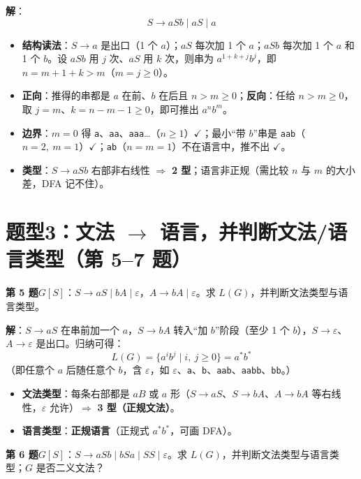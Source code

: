 \documentclass[12pt,a4paper,fontset=windows]{ctexart}
\newcommand{\ok}{\ensuremath{\checkmark}}
\newcommand{\imp}{\ensuremath{\Rightarrow}}
\begin{document}
\textbf{解}：
\[
S \to aSb \mid aS \mid a
\]
\begin{itemize}
\item \textbf{结构读法}：$S \to a$ 是出口（1 个 $a$）；$aS$ 每次加 1 个 $a$；$aSb$ 每次加 1 个 $a$ 和 1 个 $b$。设 $aSb$ 用 $j$ 次、$aS$ 用 $k$ 次，则串为 $a^{1+k+j} b^{j}$，即 $n = m + 1 + k > m$（$m = j \ge 0$）。
\item \textbf{正向}：推得的串都是 $a$ 在前、$b$ 在后且 $n > m \ge 0$；\textbf{反向}：任给 $n > m \ge 0$，取 $j = m$、$k = n-m-1 \ge 0$，即可推出 $a^n b^m$。
\item \textbf{边界}：$m = 0$ 得 \texttt{a}、\texttt{aa}、\texttt{aaa}…（$n \ge 1$）\ok；最小``带 $b$''串是 \texttt{aab}（$n=2,\ m=1$）\ok；\texttt{ab}（$n=m=1$）不在语言中，推不出 \ok。
\item \textbf{类型}：$S \to aSb$ 右部非右线性 \imp{} \textbf{2 型}；语言非正规（需比较 $n$ 与 $m$ 的大小差，DFA 记不住）。
\end{itemize}

\section{\texorpdfstring{题型3：文法 $\to$ 语言，并判断文法/语言类型（第 5--7 题）}{题型3：文法→语言，并判断文法/语言类型（第 5–7 题）}}

\begin{qbox}
{\large\bfseries 第 5 题}\quad $G[S]$：$S \to aS \mid bA \mid \varepsilon$，$A \to bA \mid \varepsilon$。求 $L(G)$，并判断文法类型与语言类型。
\end{qbox}

\textbf{解}：$S \to aS$ 在串前加一个 $a$，$S \to bA$ 转入``加 $b$''阶段（至少 1 个 $b$），$S \to \varepsilon$、$A \to \varepsilon$ 是出口。归纳可得：
\[
L(G)=\{a^i b^j \mid i,\ j \ge 0\} = a^* b^*
\]
（即任意个 $a$ 后随任意个 $b$，含 $\varepsilon$，如 \texttt{$\varepsilon$}、\texttt{a}、\texttt{b}、\texttt{aab}、\texttt{aabb}、\texttt{bb}。）
\begin{itemize}
\item \textbf{文法类型}：每条右部都是 $aB$ 或 $a$ 形（$S \to aS$、$S \to bA$、$A \to bA$ 等右线性，$\varepsilon$ 允许）\imp{} \textbf{3 型（正规文法）}。
\item \textbf{语言类型}：\textbf{正规语言}（正规式 $a^*b^*$，可画 DFA）。
\end{itemize}

\begin{qbox}
{\large\bfseries 第 6 题}\quad $G[S]$：$S \to aSb \mid bSa \mid SS \mid \varepsilon$。求 $L(G)$，并判断文法类型与语言类型；$G$ 是否二义文法？
\end{qbox}
\end{document}
